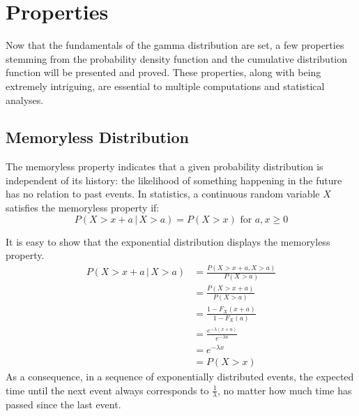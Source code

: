 \documentclass[12pt]{article}
\begin{document}

\pagebreak
\section{Properties}
Now that the fundamentals of the gamma distribution are set, a few properties stemming from the probability density
function and the cumulative distribution function will be presented and proved. These properties, along
with being extremely intriguing, are essential to multiple computations and statistical analyses.

\subsection{Memoryless Distribution}
The memoryless property indicates that a given probability distribution is independent of its history: the likelihood of
something happening in the future has no relation to past events. In statistics, a continuous random variable $X$
satisfies the memoryless property if:
 \begin{equation}
	P(X>x+a\, |\, X>a) = P(X>x)\text{ for }a, x \geq 0
 \end{equation}

 It is easy to show that the exponential distribution displays the memoryless property.
 \begin{equation}
	 \begin{split}
		 P(X>x+a \, |\, X>a)	&=	\frac{P(X>x+a, X>a)}{P(X>a)}\\
		 						&=	\frac{P(X>x+a)}{P(X>a)}\\
								&=	\frac{1-F_X(x+a)}{1-F_X(a)}\\
								&=	\frac{e^{-\lambda(x+a)}}{e^{-\lambda a}}\\
								&=	e^{-\lambda x}\\
								&=	P(X>x)
	 \end{split}
 \end{equation}
As a consequence, in a sequence of exponentially distributed events, the expected time until the next event always
corresponds to $\frac{1}{\lambda}$, no matter how much time has passed since the last event.
\end{document}
